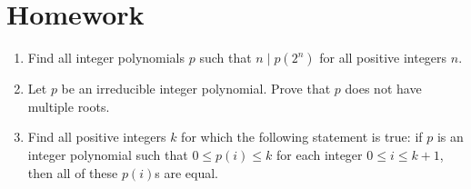 \documentclass{article}
\begin{document}
\section{Homework}
\begin{enumerate}
  \item Find all integer polynomials $p$ such that $n\mid p(2^n)$ for all
    positive integers $n$.
  \item Let $p$ be an irreducible integer polynomial. Prove that $p$ does not
    have multiple roots.
  \item Find all positive integers $k$ for which the following statement is
    true: if $p$ is an integer polynomial such that $0\le p(i)\le k$ for each
    integer $0\le i\le k+1$, then all of these $p(i)$s are equal.
\end{enumerate}
\end{document}
